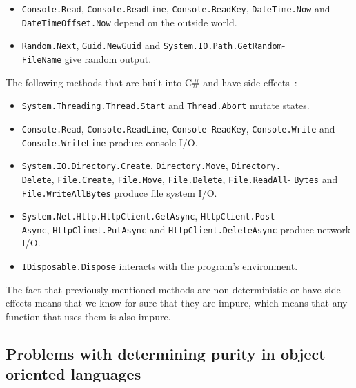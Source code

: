 \documentclass[a4paper,12pt]{article}
\begin{document}
\begin{itemize}
  \item \texttt{Console.Read}, \texttt{Console.ReadLine}, \texttt{Console.ReadKey}, \texttt{DateTime\allowbreak.Now} and \texttt{DateTimeOffset.Now} depend on the outside world.
\item \texttt{Random.Next}, \texttt{Guid.NewGuid} and \texttt{System.IO.Path.GetRandom}-\\\texttt{\allowbreak FileName} give random output.
\end{itemize}


The following methods that are built into C\# and have side-effects~\cite{dixin2015}:

\begin{itemize}
  \item \texttt{System.Threading.Thread.Start} and \texttt{Thread.Abort} mutate states.
  \item \texttt{Console.Read}, \texttt{Console.ReadLine}, \texttt{Console-ReadKey}, \texttt{Console.\allowbreak Write} and \texttt{Console.WriteLine} produce console I/O.
  \item \texttt{System.IO.Directory.Create}, \texttt{Directory.Move}, \texttt{Directory.}\\\texttt{Delete}, \texttt{File.Create}, \texttt{File.Move}, \texttt{File.Delete}, \texttt{File.ReadAll\allowbreak }- \texttt{Bytes} and \texttt{File.WriteAllBytes} produce file system I/O.
\item \texttt{System.Net.Http.HttpClient.GetAsync}, \texttt{HttpClient.Post}- \\\texttt{Async}, \texttt{HttpClinet.PutAsync} and \texttt{HttpClient.DeleteAsync} produce network I/O.
  \item \texttt{IDisposable.Dispose} interacts with the program's environment.
\end{itemize}

The fact that previously mentioned methods are non-deterministic or have side-effects means that we know for sure that they are impure, which means that any function that uses them is also impure.

\subsection{Problems with determining purity in object oriented languages} \label{sub:Problems with determining purity in object oriented languages}
\end{document}
